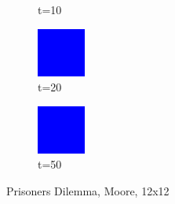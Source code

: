\documentclass[a4paper, 11pt]{article}
\begin{document}
\begin{figure}[H]
\begin{subfigure}{.16\textwidth}
  \caption{t=10}
\end{subfigure}%
\begin{subfigure}{.16\textwidth}
  \centering
  \includegraphics[width=0.9\linewidth]{PRISONERS_DILEMMA_MOORE_12x12_t20}
  \caption{t=20}
\end{subfigure}%
\begin{subfigure}{.16\textwidth}
  \centering
  \includegraphics[width=0.9\linewidth]{PRISONERS_DILEMMA_MOORE_12x12_t50}
  \caption{t=50}
\end{subfigure}
\caption{Prisoners Dilemma, Moore, 12x12}
\end{figure}
\end{document}
